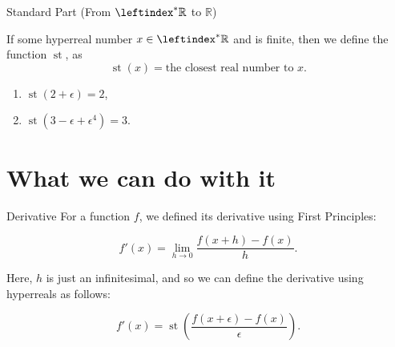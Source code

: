 \documentclass{beamer}
\DeclareMathOperator{\st}{st}
\newcommand{\ls}{\leftindex^*}
\newcommand{\RR}{\mathbb{R}}
\newcommand{\HR}{\ls{\RR}}
\begin{document}
\begin{frame}{Standard Part (From \(\HR\) to \(\RR\))} \pause
    \begin{definition}
        If some hyperreal number \(x \in \HR\) and is finite, then we define the function \(\st\), as
        \[
            \st (x) = \text{the closest real number to \(x\)}.
        \]
    \end{definition} \pause

    \begin{examples}
        \begin{enumerate}
            \item \(\st (2 + \epsilon) = 2\), \pause
            \item \(\st (3 - \epsilon + \epsilon^4) = 3\).
        \end{enumerate}
    \end{examples}

\end{frame}

\section{What we can do with it}

\begin{frame}{Derivative}
    For a function \(f\), we defined its derivative using First Principles:
    \begin{definition}
        \[
            f'(x) = \lim_{h \rightarrow 0} \frac{f(x+h) - f(x)}{h}.
        \]
    \end{definition}\pause

    Here, \(h\) is just an infinitesimal, and so we can define the derivative using hyperreals as follows:
    \begin{definition}
        \[
            f'(x) = \st\left(\frac{f(x + \epsilon) - f(x)}{\epsilon}\right).
        \]
    \end{definition}
\end{frame}
\end{document}
